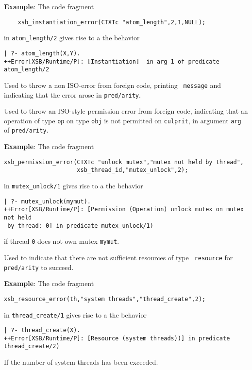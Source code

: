 \begin{description}
{\bf Example}: The code fragment
%
\begin{verbatim}
    xsb_instantiation_error(CTXTc "atom_length",2,1,NULL);
\end{verbatim}
in {\tt atom\_length/2} gives rise to a the behavior
\begin{verbatim}
| ?- atom_length(X,Y).
++Error[XSB/Runtime/P]: [Instantiation]  in arg 1 of predicate atom_length/2
\end{verbatim}


  
%
Used to throw a non ISO-error from foreign code, printing {\tt
  message} and indicating that the error arose in {\tt pred/arity}.


%
Used to throw an ISO-style permission error from foreign code,
indicating that an operation of type {\tt op} on type {\tt obj} is not
permitted on {\tt culprit}, in argument {\tt arg} of {\tt pred/arity}.

{\bf Example}: The code fragment
%
\begin{verbatim}
xsb_permission_error(CTXTc "unlock mutex","mutex not held by thread",
                     xsb_thread_id,"mutex_unlock",2);
\end{verbatim}
in {\tt mutex\_unlock/1} gives rise to a the behavior
\begin{verbatim}
| ?- mutex_unlock(mymut).
++Error[XSB/Runtime/P]: [Permission (Operation) unlock mutex on mutex not held
 by thread: 0] in predicate mutex_unlock/1)
\end{verbatim}
if thread {\tt 0} does not own mutex {\tt mymut}.


 
%
Used to indicate that there are not sufficient resources of type {\tt
  resource} for {\tt pred/arity} to succeed.

{\bf Example}: The code fragment
%
\begin{verbatim}
xsb_resource_error(th,"system threads","thread_create",2);
\end{verbatim}
in {\tt thread\_create/1} gives rise to a the behavior
\begin{verbatim}
| ?- thread_create(X).
++Error[XSB/Runtime/P]: [Resource (system threads))] in predicate thread_create/2)
\end{verbatim}
If the number of system threads has been exceeded.


\end{description}
